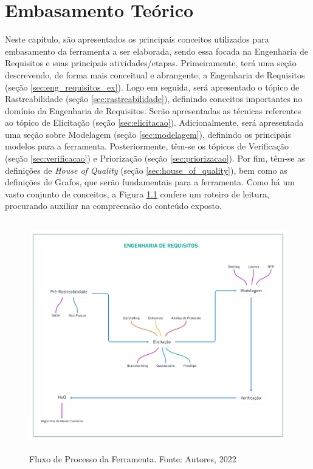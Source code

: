 \chapter[Embasamento Teórico]{Embasamento Teórico}

\label{chap:embasamento_teorico}

Neste capítulo, são apresentados os principais conceitos utilizados para embasamento da ferramenta a ser elaborada, sendo essa focada na Engenharia de Requisitos e suas principais atividades/etapas. Primeiramente, terá uma seção descrevendo, de forma mais conceitual e abrangente, a Engenharia de Requisitos (seção \ref{sec:eng_requisitos_ex}). Logo em seguida, será apresentado o tópico de Rastreabilidade (seção \ref{sec:rastreabilidade}), definindo conceitos importantes no domínio da Engenharia de Requisitos. Serão apresentadas as técnicas referentes ao tópico de Elicitação (seção \ref{sec:elicitacao}). Adicionalmente, será apresentada uma seção sobre Modelagem (seção \ref{sec:modelagem}), definindo os principais modelos para a ferramenta. Posteriormente, têm-se os tópicos de Verificação (seção \ref{sec:verificacao}) e Priorização (seção \ref{sec:priorizacao}). Por fim, têm-se as definições de \textit{House of Quality} (seção \ref{sec:house_of_quality}), bem como as definições de Grafos, que serão fundamentais para a ferramenta. Como há um vasto conjunto de conceitos, a Figura \ref{fig:roadmap} confere um roteiro de leitura, procurando auxiliar na compreensão do conteúdo exposto.

\begin{figure}[H]
        \begin{center}
        \includegraphics[width=12cm, height=10cm, keepaspectratio]{figuras/Embasamento/roadmap.png}
        \caption{{Fluxo de Processo da Ferramenta. Fonte: Autores, 2022}}
        \label{fig:roadmap}
    \end{center}
\end{figure}

